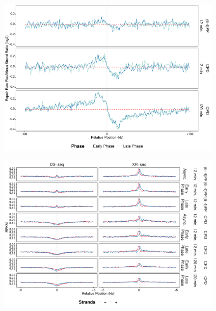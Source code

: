 \begin{figure}[H]
\begin{center}
\includegraphics[width=\textwidth]{Chapters/7_appendix/figures/supfig45}
\caption[]{}
\label{supfig:}
\end{center}
\end{figure}

\begin{figure}[H]
\begin{center}
\includegraphics[width=\textwidth]{Chapters/7_appendix/figures/supfig46}
\caption[]{}
\label{supfig:}
\end{center}
\end{figure}


